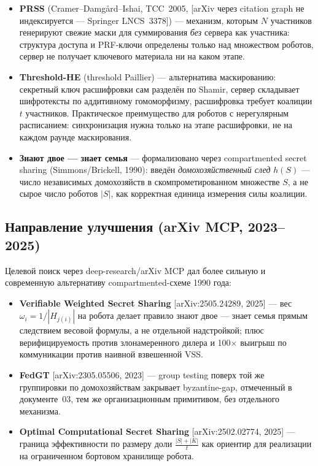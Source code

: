 \documentclass[11pt]{article}
\begin{document}
\begin{itemize}
  \item \textbf{PRSS} (Cramer--Damgård--Ishai, TCC~2005, [arXiv через citation graph
        не индексируется — Springer LNCS~3378]) — механизм, которым $N$ участников
        генерируют свежие маски для суммирования \emph{без} сервера как участника:
        структура доступа и PRF-ключи определены только над множеством роботов,
        сервер не получает ключевого материала ни на каком этапе.
  \item \textbf{Threshold-HE} (threshold Paillier) — альтернатива маскированию:
        секретный ключ расшифровки сам разделён по Shamir, сервер складывает
        шифротексты по аддитивному гомоморфизму, расшифровка требует коалиции
        $t$ участников. Практическое преимущество для роботов с нерегулярным
        расписанием: синхронизация нужна только на этапе расшифровки, не на каждом
        раунде маскирования.
  \item \textbf{\guillemotleft Знают двое — знает семья\guillemotright} —
        формализовано через compartmented secret sharing (Simmons/Brickell,
        1990): введён \emph{домохозяйственный след} $h(S)$ — число независимых
        домохозяйств в скомпрометированном множестве $S$, а не сырое число роботов
        $|S|$, как корректная единица измерения силы коалиции.
\end{itemize}

\subsection*{Направление улучшения (arXiv MCP, 2023--2025)}

Целевой поиск через deep-research/arXiv MCP дал более сильную и современную
альтернативу compartmented-схеме 1990 года:

\begin{itemize}
  \item \textbf{Verifiable Weighted Secret Sharing} [arXiv:2505.24289, 2025] —
        вес $\omega_i=1/|H_{j(i)}|$ на робота делает правило
        \guillemotleft знают двое — знает семья\guillemotright{} прямым следствием
        весовой формулы, а не отдельной надстройкой; плюс верифицируемость против
        злонамеренного дилера и 100$\times$ выигрыш по коммуникации против наивной
        взвешенной VSS.
  \item \textbf{FedGT} [arXiv:2305.05506, 2023] — group testing поверх той же
        группировки по домохозяйствам закрывает byzantine-gap, отмеченный в
        документе~03, тем же организационным примитивом, без отдельного механизма.
  \item \textbf{Optimal Computational Secret Sharing} [arXiv:2502.02774, 2025] —
        граница эффективности по размеру доли $\frac{|S|+|K|}{t}$ как ориентир
        для реализации на ограниченном бортовом хранилище робота.
\end{itemize}
\end{document}
